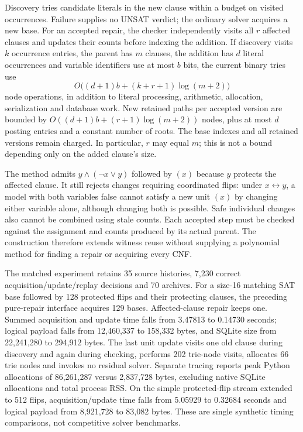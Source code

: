 \documentclass[11pt,a4paper]{article}
\numberwithin{equation}{section}
\theoremstyle{plain}
\theoremstyle{definition}
\theoremstyle{remark}
\begin{document}
Discovery tries candidate literals in the new clause within a budget on visited occurrences. Failure supplies no UNSAT verdict; the ordinary solver acquires a new base. For an accepted repair, the checker independently visits all $r$ affected clauses and updates their counts before indexing the addition. If discovery visits $k$ occurrence entries, the parent has $m$ clauses, the addition has $d$ literal occurrences and variable identifiers use at most $b$ bits, the current binary tries use
\[
O\bigl((d+1)b+(k+r+1)\log(m+2)\bigr)
\]
node operations, in addition to literal processing, arithmetic, allocation, serialization and database work. New retained paths per accepted version are bounded by $O((d+1)b+(r+1)\log(m+2))$ nodes, plus at most $d$ posting entries and a constant number of roots. The base indexes and all retained versions remain charged. In particular, $r$ may equal $m$; this is not a bound depending only on the added clause's size.

The method admits $y\land(\neg x\lor y)$ followed by $(x)$ because $y$ protects the affected clause. It still rejects changes requiring coordinated flips: under $x\leftrightarrow y$, a model with both variables false cannot satisfy a new unit $(x)$ by changing either variable alone, although changing both is possible. Safe individual changes also cannot be combined using stale counts. Each accepted step must be checked against the assignment and counts produced by its actual parent. The construction therefore extends witness reuse without supplying a polynomial method for finding a repair or acquiring every CNF.

The matched experiment retains 35 source histories, 7,230 correct acquisition/update/replay decisions and 70 archives. For a size-16 matching SAT base followed by 128 protected flips and their protecting clauses, the preceding pure-repair interface acquires 129 bases. Affected-clause repair keeps one. Summed acquisition and update time falls from 3.47813 to 0.14730 seconds; logical payload falls from 12,460,337 to 158,332 bytes, and SQLite size from 22,241,280 to 294,912 bytes. The last unit update visits one old clause during discovery and again during checking, performs 202 trie-node visits, allocates 66 trie nodes and invokes no residual solver. Separate tracing reports peak Python allocations of 86,261,287 versus 2,837,728 bytes, excluding native SQLite allocations and total process RSS. On the simple protected-flip stream extended to 512 flips, acquisition/update time falls from 5.05929 to 0.32684 seconds and logical payload from 8,921,728 to 83,082 bytes. These are single synthetic timing comparisons, not competitive solver benchmarks.
\end{document}
